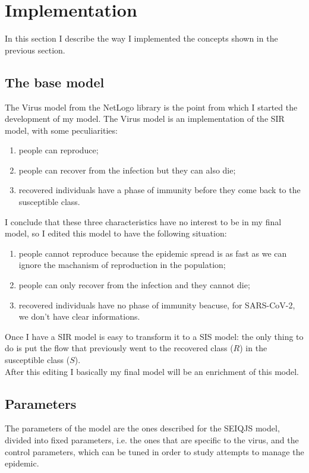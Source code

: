 \documentclass[12pt]{llncs}
\begin{document}
\section{Implementation}
In this section I describe the way I implemented the concepts shown in the previous section.

\subsection{The base model}
The Virus model from the NetLogo library \cite{netlogo-virus} is the point from which I started the development of my model. The Virus model is an implementation of the SIR model, with some peculiarities:
\begin{enumerate}
\item people can reproduce;
\item people can recover from the infection but they can also die;
\item recovered individuals have a phase of immunity before they come back to the susceptible class.
\end{enumerate}
I conclude that these three characteristics have no interest to be in my final model, so I edited this model to have the following situation:
\begin{enumerate}
\item people cannot reproduce because the epidemic spread is as fast as we can ignore the machanism of reproduction in the population;
\item people can only recover from the infection and they cannot die;
\item recovered individuals have no phase of immunity beacuse, for SARS-CoV-2, we don't have clear informations.
\end{enumerate}
Once I have a SIR model is easy to transform it to a SIS model: the only thing to do is put the flow that previously went to the recovered class ($R$) in the susceptible class ($S$).\\
After this editing I basically my final model will be an enrichment of this model.

\subsection{Parameters}
The parameters of the model are the ones described for the SEIQJS model, divided into fixed parameters, i.e. the ones that are specific to the virus, and the control parameters, which can be tuned in order to study attempts to manage the epidemic.
\end{document}
